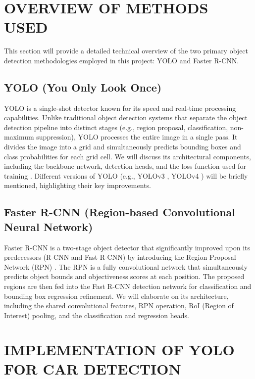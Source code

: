 \documentclass[conference]{IEEEtran}
\begin{document}
\section{\uppercase{Overview of Methods Used}}
\label{sec:methods}

This section will provide a detailed technical overview of the two primary object detection methodologies employed in this project: YOLO and Faster R-CNN.

\subsection{YOLO (You Only Look Once)}
\label{ssec:yolo_overview} 
YOLO is a single-shot detector known for its speed and real-time processing capabilities. Unlike traditional object detection systems that separate the object detection pipeline into distinct stages (e.g., region proposal, classification, non-maximum suppression), YOLO processes the entire image in a single pass. It divides the image into a grid and simultaneously predicts bounding boxes and class probabilities for each grid cell. We will discuss its architectural components, including the backbone network, detection heads, and the loss function used for training \cite{redmon2016you}. Different versions of YOLO (e.g., YOLOv3 \cite{redmon2018yolov3}, YOLOv4 \cite{bochkovskiy2020yolov4}) will be briefly mentioned, highlighting their key improvements.

\subsection{Faster R-CNN (Region-based Convolutional Neural Network)}
\label{ssec:fastrcnn_overview} 
Faster R-CNN is a two-stage object detector that significantly improved upon its predecessors (R-CNN and Fast R-CNN) by introducing the Region Proposal Network (RPN) \cite{ren2015faster}. The RPN is a fully convolutional network that simultaneously predicts object bounds and objectiveness scores at each position. The proposed regions are then fed into the Fast R-CNN detection network for classification and bounding box regression refinement. We will elaborate on its architecture, including the shared convolutional features, RPN operation, RoI (Region of Interest) pooling, and the classification and regression heads.


\section{\uppercase{Implementation of YOLO for Car Detection}} 
\label{sec:yolo_implementation}
\end{document}
